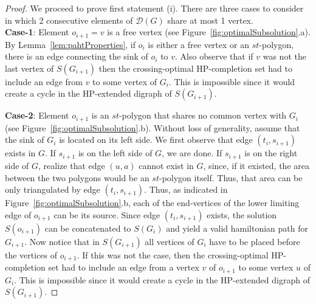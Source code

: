 \documentclass{myllncs-mixalis}
\begin{document}
\begin{proof}
We proceed to prove first statement (i). There are three cases to
consider in which 2 consecutive elements of
$\mathcal{D}(G)$ share at most 1 vertex.\\
\textbf{Case-1}: Element $o_{i+1}=v$ is a free vertex (see
Figure~\ref{fig:optimalSubsolution}.a). By
Lemma~\ref{lem:pahtProperties}, if $o_i$ is either a free vertex or
an $st$-polygon, there is an edge connecting the sink of $o_i$ to
$v$. Also observe that if $v$ was not the last vertex of
$S(G_{i+1})$ then the crossing-optimal HP-completion set had to
include an edge from $v$ to some vertex of $G_i$. This is impossible
since it would create a cycle in the HP-extended digraph of
$S(G_{i+1})$.

\textbf{Case-2}: Element $o_{i+1}$ is an $st$-polygon that shares no
common vertex with $G_i$ (see
Figure~\ref{fig:optimalSubsolution}.b). Without loss of generality,
assume that the sink of $G_i$ is located on its left side. We first
observe that edge $(t_i, s_{i+1})$ exists in $G$. If $s_{i+1}$ is on
the left side of $G$, we are done. If $s_{i+1}$ is on the right side
of $G$, realize that edge $(u,a)$ cannot exist in $G$, since, if it
existed, the area between the two polygons would be an $st$-polygon
itself. Thus, that area can be only triangulated by edge $(t_i,
s_{i+1})$. Thus, as indicated in
Figure~\ref{fig:optimalSubsolution}.b, each of the end-vertices of
the lower limiting edge of $o_{i+1}$ can be its source. Since edge
$(t_i, s_{i+1})$ exists, the solution $S(o_{i+1})$ can be
concatenated to $S(G_i)$ and yield a valid hamiltonian path for
$G_{i+1}$. Now notice that in $S(G_{i+1})$ all vertices of $G_i$
have to be placed before the vertices of $o_{i+1}$. If this was not
the case, then the crossing-optimal HP-completion set had to include
an edge from a vertex $v$ of $o_{i+1}$ to some vertex $u$ of $G_i$.
This is impossible since it would create a cycle in the HP-extended
digraph of $S(G_{i+1})$.


\end{proof}
\end{document}
